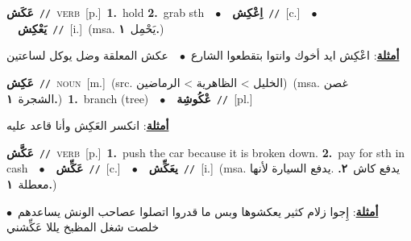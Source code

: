 \documentclass[10pt,a4paper,twoside]{article} %
\begin{document}
\begin{multicols}{2}
{\setlength\topsep{0pt}\textbf{\foreignlanguage{arabic}{عَكَش}}\ {\color{gray}\texttt{//}\color{black}}\ \textsc{verb}\ [p.]\ \textbf{1.}~hold  \textbf{2.}~grab sth\ \ $\bullet$\ \ \setlength\topsep{0pt}\textbf{\foreignlanguage{arabic}{اِعْكِش}}\ {\color{gray}\texttt{//}\color{black}}\ [c.]\ \ $\bullet$\ \ \setlength\topsep{0pt}\textbf{\foreignlanguage{arabic}{يَعْكِش}}\ {\color{gray}\texttt{//}\color{black}}\ [i.]\ \color{gray}(msa. \foreignlanguage{arabic}{يَحْمِل}~\foreignlanguage{arabic}{\textbf{١.}})\color{black}\  \begin{flushright}\color{gray}\foreignlanguage{arabic}{\textbf{\underline{\foreignlanguage{arabic}{أمثلة}}}: اعْكِش ايد أخوك وانتوا بتقطعوا الشارع\ $\bullet$\ \  عكش المعلقة وضل يوكل لساعتين}\end{flushright}\color{black}} \vspace{2mm}

{\setlength\topsep{0pt}\textbf{\foreignlanguage{arabic}{عَكِش}}\ {\color{gray}\texttt{//}\color{black}}\ \textsc{noun}\ [m.]\ (src. \color{gray}\foreignlanguage{arabic}{الخليل > الظاهرية > الرماضين}\color{black})\ \color{gray}(msa. \foreignlanguage{arabic}{غصن الشجرة}~\foreignlanguage{arabic}{\textbf{١.}})\color{black}\ \textbf{1.}~branch (tree)\ \ $\bullet$\ \ \setlength\topsep{0pt}\textbf{\foreignlanguage{arabic}{عْكُوشِة}}\ {\color{gray}\texttt{//}\color{black}}\ [pl.]\  \begin{flushright}\color{gray}\foreignlanguage{arabic}{\textbf{\underline{\foreignlanguage{arabic}{أمثلة}}}: انكسر العَكِش وأنا قاعد عليه}\end{flushright}\color{black}} \vspace{2mm}

{\setlength\topsep{0pt}\textbf{\foreignlanguage{arabic}{عَكَّش}}\ {\color{gray}\texttt{//}\color{black}}\ \textsc{verb}\ [p.]\ \textbf{1.}~push the car because it is broken down.  \textbf{2.}~pay for sth in cash\ \ $\bullet$\ \ \setlength\topsep{0pt}\textbf{\foreignlanguage{arabic}{عَكِّش}}\ {\color{gray}\texttt{//}\color{black}}\ [c.]\ \ $\bullet$\ \ \setlength\topsep{0pt}\textbf{\foreignlanguage{arabic}{يعَكِّش}}\ {\color{gray}\texttt{//}\color{black}}\ [i.]\ \color{gray}(msa. \foreignlanguage{arabic}{يدفع كاش}~\foreignlanguage{arabic}{\textbf{٢.}}  .\foreignlanguage{arabic}{يدفع السيارة لأنها معطلة}~\foreignlanguage{arabic}{\textbf{١.}})\color{black}\  \begin{flushright}\color{gray}\foreignlanguage{arabic}{\textbf{\underline{\foreignlanguage{arabic}{أمثلة}}}: إِجوا زلام كثير يعكشوها وبس ما قدروا اتصلوا عصاحب الونش يساعدهم\ $\bullet$\ \  خلصت شغل المظبخ يللا عَكِّشني}\end{flushright}\color{black}} \vspace{2mm}


\end{multicols}
\end{document}
